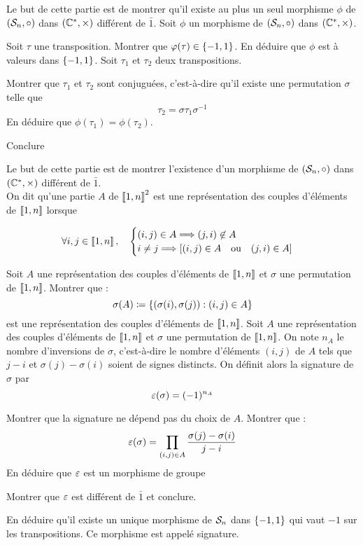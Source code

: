 \documentclass{magnolia}
\begin{document}
\begin{questions}
\question Le but de cette partie est de montrer qu'il existe au plus un
  seul morphisme $\phi$ de $(\mathcal{S}_{n},\circ)$ dans $(\mathbb{C}^*,\times)$
  différent de $\bar{1}$.
  Soit $\phi$ un morphisme de $(\mathcal{S}_{n},\circ)$ dans $(\mathbb{C}^*,\times)$.
  \begin{questions}
  \question Soit $\tau$ une transposition. Montrer que $\varphi(\tau)\in
    \left\{-1,1\right\}$.
  \question En déduire que $\phi$ est à valeurs dans $\left\{-1,1\right\}$.
  \question Soit $\tau_1$ et $\tau_2$ deux transpositions.
    \begin{questions}
    \question Montrer que $\tau_1$ et $\tau_2$ sont conjuguées, c'est-à-dire
      qu'il existe une permutation $\sigma$ telle que
      $$\tau_2 = \sigma \tau_1 \sigma^{-1}$$
    \question En déduire que $\phi(\tau_1)=\phi(\tau_2)$.
    \end{questions}
  \question Conclure
  \end{questions}
\question Le but de cette partie est de montrer l'existence d'un morphisme de
  $(\mathcal{S}_{n},\circ)$ dans $(\mathbb{C}^*,\times)$ différent de $\bar{1}$.\\
  On dit qu'une partie $A$ de $\left\llbracket 1,n\right\rrbracket^2$ est une représentation
  des couples d'éléments de $\left\llbracket 1,n\right\rrbracket$ lorsque

  $$\forall i,j \in\left\llbracket 1,n\right\rrbracket
  ,\quad
  \begin{cases}
  (i,j)\in A \Longrightarrow (j,i)\not\in A\\
  i\neq j \Longrightarrow \left[(i,j)\in A \quad\text{ou}\quad (j,i)\in A\right]
  \end{cases}
  $$
  \begin{questions}
  \question Soit $A$ une représentation des couples d'éléments de
    $\left\llbracket 1,n\right\rrbracket$ et $\sigma$ une permutation de
    $\left\llbracket 1,n\right\rrbracket$. Montrer que : 
    $$\sigma(A)\coloneqq\left\{ (\sigma(i),\sigma(j)) : (i,j)\in A \right\}$$
    est une représentation des couples d'éléments de $\left\llbracket 1,n\right\rrbracket$.
  \question Soit $A$ une représentation des couples d'éléments de
    $\left\llbracket 1,n\right\rrbracket$ et $\sigma$ une permutation de
    $\left\llbracket 1,n\right\rrbracket$. On note $n_A$ le nombre d'inversions de $\sigma$,
    c'est-à-dire le nombre d'éléments $(i,j)$ de $A$ tels que $j-i$ et
    $\sigma(j)-\sigma(i)$ soient de signes distincts. On définit alors
    la signature de $\sigma$ par
    $$\signature(\sigma)=(-1)^{n_A}$$
    \begin{questions}
    \question Montrer que la signature ne dépend pas du choix de $A$.
    \question Montrer que :
      $$\signature(\sigma)=\prod_{(i,j)\in A}
                         \frac{\sigma(j)-\sigma(i)}{j-i}$$
    \question En déduire que $\signature$ est un morphisme de groupe
    \end{questions}
  \question Montrer que $\signature$ est différent de $\bar{1}$ et conclure.
  \end{questions}
\question En déduire qu'il existe un unique morphisme de $\mathcal{S}_{n}$ dans
  $\left\{-1,1\right\}$ qui vaut $-1$ sur les transpositions. Ce morphisme est
  appelé signature.
\end{questions}


\end{document}
